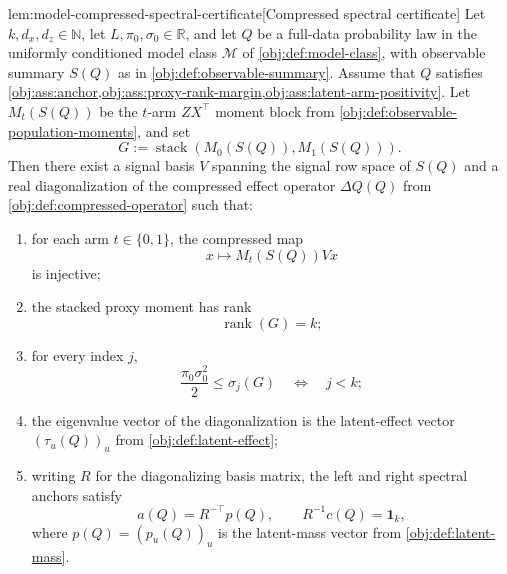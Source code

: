 \begin{lemmav}{lem:model-compressed-spectral-certificate}[Compressed spectral certificate]
Let \(k,d_x,d_z\in\mathbb N\), let \(L,\pi_0,\sigma_0\in\mathbb R\), and let \(Q\) be a full-data probability law in the uniformly conditioned model class \(\mathcal M\) of \cref{obj:def:model-class}, with observable summary \(S(Q)\) as in \cref{obj:def:observable-summary}. Assume that \(Q\) satisfies \cref{obj:ass:anchor,obj:ass:proxy-rank-margin,obj:ass:latent-arm-positivity}. Let \(M_t(S(Q))\) be the \(t\)-arm \(ZX^\top\) moment block from \cref{obj:def:observable-population-moments}, and set
\[
G:=\operatorname{stack}(M_0(S(Q)),M_1(S(Q))).
\]
Then there exist a signal basis \(V\) spanning the signal row space of \(S(Q)\) and a real diagonalization of the compressed effect operator \(\Delta Q(Q)\) from \cref{obj:def:compressed-operator} such that:
\begin{enumerate}
\item for each arm \(t\in\{0,1\}\), the compressed map
\[
x\longmapsto M_t(S(Q))Vx
\]
is injective;
\item the stacked proxy moment has rank
\[
\operatorname{rank}(G)=k;
\]
\item for every index \(j\),
\[
\frac{\pi_0\sigma_0^2}{2}\le \sigma_j(G)
\quad\Longleftrightarrow\quad
j<k;
\]
\item the eigenvalue vector of the diagonalization is the latent-effect vector \((\tau_u(Q))_u\) from \cref{obj:def:latent-effect};
\item writing \(R\) for the diagonalizing basis matrix, the left and right spectral anchors satisfy
\[
a(Q)=R^{-\top}p(Q),
\qquad
R^{-1}c(Q)=\mathbf 1_k,
\]
where \(p(Q)=(p_u(Q))_u\) is the latent-mass vector from \cref{obj:def:latent-mass}.
\end{enumerate}
\end{lemmav}

